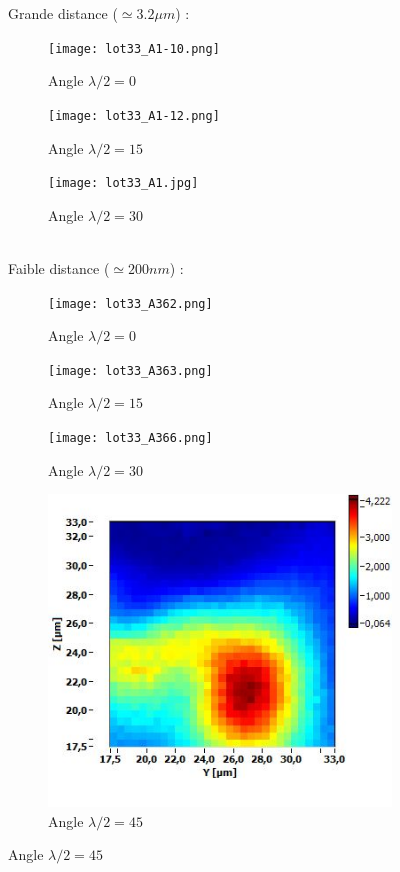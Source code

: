 \documentclass[landscape,a4paper,11pt]{article}
\title{}
\author{}
\begin{document}
\begin{figure}[htb]
\centering
  Grande distance ($\simeq 3.2\mu m$) :\\
    \vspace{5mm}
  \begin{subfigure}[b]{.14\linewidth}
    \centering
    \texttt{[image: lot33\_A1-10.png]}
    \caption{Angle $\lambda/2 = 0$}\label{fig:1g}
  \end{subfigure}%
  \begin{subfigure}[b]{.14\linewidth}
    \centering
    \texttt{[image: lot33\_A1-12.png]}
    \caption{Angle $\lambda/2 = 15$}\label{fig:1f}
  \end{subfigure}%
  \begin{subfigure}[b]{.14\linewidth}
    \centering
    \texttt{[image: lot33\_A1.jpg]}
    \caption{Angle $\lambda/2 = 30$}\label{fig:1e}
  \end{subfigure}%
  \\
  \vspace{1cm}
  Faible distance ($\simeq 200nm$) :\\
  \vspace{5mm}
  \begin{subfigure}[b]{.14\linewidth}
    \centering
    \texttt{[image: lot33\_A362.png]}
    \caption{Angle $\lambda/2 = 0$}\label{fig:1g}
  \end{subfigure}%
  \begin{subfigure}[b]{.14\linewidth}
    \centering
    \texttt{[image: lot33\_A363.png]}
    \caption{Angle $\lambda/2 = 15$}\label{fig:1f}
  \end{subfigure}%
  \begin{subfigure}[b]{.14\linewidth}
    \centering
    \texttt{[image: lot33\_A366.png]}
    \caption{Angle $\lambda/2 = 30$}\label{fig:1e}
  \end{subfigure}%
  \begin{subfigure}[b]{.14\linewidth}
    \centering
    \includegraphics[width=.99\textwidth]{scan_049_g1}
    \caption{Angle $\lambda/2 = 45$}\label{fig:1d}
  \end{subfigure}%
\end{figure}
\end{document}
